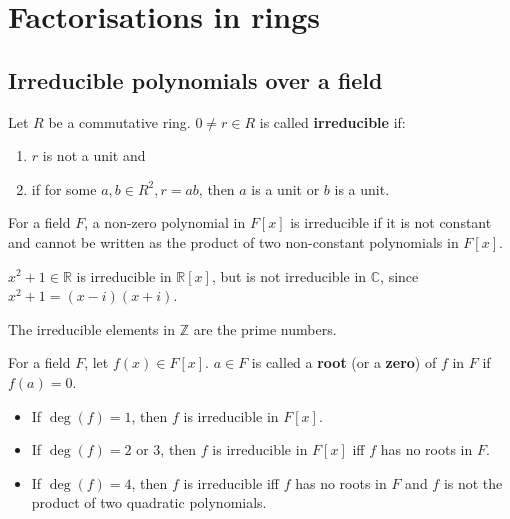 \section{Factorisations in rings}

\subsection{Irreducible polynomials over a field}

\begin{definition}
	Let $R$ be a commutative ring. $0 \ne r \in R$ is called \textbf{irreducible} if:
	\begin{enumerate}
		\item $r$ is not a unit and
		\item if for some $a, b \in R^2, r = ab$, then $a$ is a unit or $b$ is a unit.
	\end{enumerate}
\end{definition}

\begin{example}
	For a field $F$, a non-zero polynomial in $F[x]$ is irreducible if it is not constant and cannot be written as the product of two non-constant polynomials in $F[x]$.
\end{example}

\begin{example}
	$x^2 + 1 \in \mathbb{R}$ is irreducible in $\mathbb{R}[x]$, but is not irreducible in $\mathbb{C}$, since $x^2 + 1 = (x - i)(x + i)$.
\end{example}

\begin{example}
	The irreducible elements in $\mathbb{Z}$ are the prime numbers.
\end{example}

\begin{definition}
	For a field $F$, let $f(x) \in F[x]$. $a \in F$ is called a \textbf{root} (or a \textbf{zero}) of $f$ in $F$ if $f(a) = 0$.
\end{definition}

\begin{proposition}\label{prop:polynomialDegreesIrreducible}
	\hfill
	\begin{itemize}
		\item If $\deg(f) = 1$, then $f$ is irreducible in $F[x]$.
		\item If $\deg(f) = 2 \text{ or } 3$, then $f$ is irreducible in $F[x]$ iff $f$ has no roots in $F$.
		\item If $\deg(f) = 4$, then $f$ is irreducible iff $f$ has no roots in $F$ and $f$ is not the product of two quadratic polynomials.
	\end{itemize}
\end{proposition}

